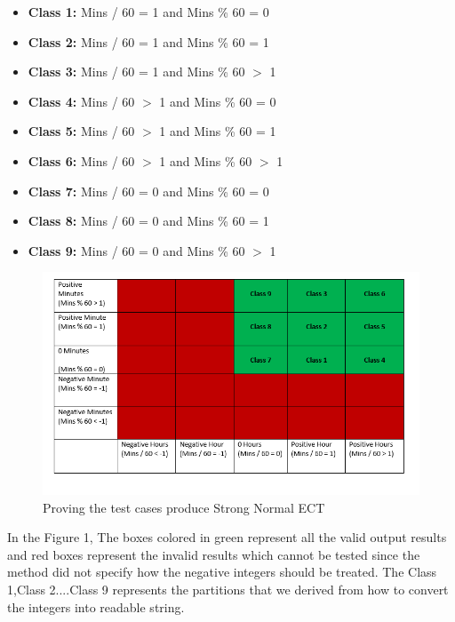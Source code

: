 \documentclass[fontsize=12pt,paper=letter,twoside]{scrartcl}
\begin{document}
\begin{itemize}
\newpage
 \begin{itemize}
\item \textbf{Class 1:} Mins / 60 = 1 and Mins \% 60 = 0 
\item \textbf{Class 2:}  Mins / 60 = 1 and Mins \% 60 = 1
\item \textbf{Class 3:} Mins / 60 = 1 and Mins \% 60  $>$  1
\item \textbf{Class 4:} Mins / 60 $>$ 1 and Mins \% 60 = 0
\item \textbf{Class 5:} Mins / 60 $>$ 1 and Mins \% 60 = 1
\item \textbf{Class 6:} Mins / 60 $>$ 1 and Mins \% 60 $>$ 1
\item \textbf{Class 7:} Mins / 60 = 0 and Mins \% 60 = 0
\item \textbf{Class 8:} Mins / 60 = 0 and Mins \% 60 = 1
\item \textbf{Class 9:} Mins / 60 = 0 and Mins \% 60 $>$ 1
\end{itemize}
\begin{figure}[!htb]
\begin{center}
\includegraphics[width=.99\textwidth]{images/bbt/bbtmatrix.png}
\end{center}
\caption{Proving the test cases produce Strong Normal ECT}
\label{fig:bbt_matrix}
\end{figure}
In the Figure 1, The boxes colored in green represent all the valid output results and red boxes represent the invalid results which cannot be tested since the method did not specify how the negative integers should be treated. The Class 1,Class 2....Class 9 represents the partitions that we derived from how to convert the integers into readable string.
\newpage
\begin{figure}[!htb]
\begin{center}

\end{center}
\end{figure}
\end{itemize}
\end{document}
